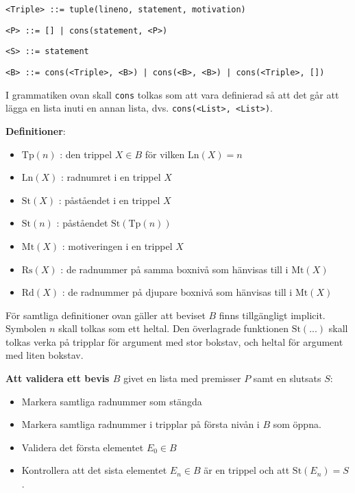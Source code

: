 \documentclass[a4paper,10.5pt]{article}
\newcommand{\Tp}[1]{\mathrm{Tp}(#1)}
\newcommand{\Ln}[1]{\mathrm{Ln}(#1)}
\newcommand{\St}[1]{\mathrm{St}(#1)}
\newcommand{\Mt}[1]{\mathrm{Mt}(#1)}
\newcommand{\Rs}[1]{\mathrm{Rs}(#1)}
\newcommand{\Rd}[1]{\mathrm{Rd}(#1)}
\begin{document}
\noindent
\texttt{<Triple> ::= tuple(lineno, statement, motivation)}

\noindent
\texttt{<P> ::= [] | cons(statement, <P>)}

\noindent
\texttt{<S> ::= statement}

\noindent
\texttt{<B> ::= cons(<Triple>, <B>) | cons(<B>, <B>) | cons(<Triple>, [])}

\bigskip
\noindent
I grammatiken ovan skall \texttt{cons} tolkas som att vara definierad så
att det går att lägga en lista inuti en annan lista, dvs. \texttt{cons(<List>, <List>)}.


\bigskip
\noindent
\textbf{Definitioner}:
\begin{itemize}
\item $\Tp{n}$ : den trippel $X \in B$ för vilken $\Ln{X} = n$
\item $\Ln{X}$ : radnumret i en trippel $X$
\item $\St{X}$ : påståendet i en trippel $X$
\item $\St{n}$ : påståendet $\St{\Tp{n}}$
\item $\Mt{X}$ : motiveringen i en trippel $X$
\item $\Rs{X}$ : de radnummer på samma boxnivå som hänvisas till i $\Mt{X}$
\item $\Rd{X}$ : de radnummer på djupare boxnivå som hänvisas till i $\Mt{X}$
\end{itemize}

\bigskip
\noindent
För samtliga definitioner ovan gäller att beviset $B$ finns tillgängligt implicit.
Symbolen $n$ skall tolkas som ett heltal. Den överlagrade funktionen $\St{...}$ skall tolkas verka på tripplar för argument
med stor bokstav, och heltal för argument med liten bokstav.

\bigskip
\noindent
\textbf{Att validera ett bevis $B$} givet en lista med premisser $P$ samt en slutsats $S$:
\begin{itemize}
\item Markera samtliga radnummer som stängda
\item Markera samtliga radnummer i tripplar på första nivån i $B$ som öppna.
\item Validera det första elementet $E_0 \in B$
\item Kontrollera att det sista elementet $E_n \in B$ är en trippel och att $\mathrm{St}(E_n) = S$.
\end{itemize}
\end{document}
